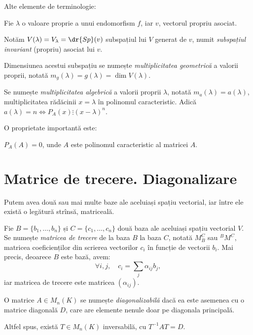Alte elemente de terminologie:
\begin{definition}\label{def:mult}
  Fie $ \lambda $ o valoare proprie a unui endomorfism $ f $, iar $ v $, vectorul
  propriu asociat.

  Notăm $ V(\lambda) = V_\lambda = \dr{Sp}(v) $ subspațiul lui $ V $ generat
  de $ v $, numit \emph{subspațiul invariant} (propriu) asociat lui $ v $.

  Dimensiunea acestui subspațiu se numește \emph{multiplicitatea geometrică}
  a valorii proprii, notată $ m_g(\lambda) = g(\lambda) = \dim V(\lambda) $.

  Se numește \emph{multiplicitatea algebrică} a valorii proprii $ \lambda $,
  notată $ m_a(\lambda) = a(\lambda) $, multiplicitatea rădăcinii $ x = \lambda $
  în polinomul caracteristic. Adică
  $ a(\lambda) = n \Leftrightarrow P_A(x) \vdots (x - \lambda)^n $.
\end{definition}

O proprietate importantă este:
\begin{theorem}\label{thm:ch}
  $ P_A(A) = 0 $, unde $ A $ este polinomul caracteristic al matricei $ A $.
\end{theorem}


\section{Matrice de trecere. Diagonalizare}

Putem avea două sau mai multe baze ale aceluiași spațiu vectorial,
iar între ele există o legătură strînsă, matriceală.

Fie $ B = \{ b_1, \dots, b_n \} $ și $ C = \{ c_1, \dots, c_n \} $ două
baza ale aceluiași spațiu vectorial $ V $. Se numește \emph{matricea de trecere}
de la baza $ B $ la baza $ C $, notată $ M_B^C $ sau $ {}^B M^C $, matricea
coeficienților din scrierea vectorilor $ c_i $ în funcție de vectorii $ b_i $.
Mai precis, deoarece $ B $ este bază, avem:
\[
  \forall i,j, \quad c_i = \sum_j \alpha_{ij} b_j,
\]
iar matricea de trecere este matricea $ (\alpha_{ij}) $.

\begin{definition}\label{def:diag}
  O matrice $ A \in M_n(K) $ se numește \emph{diagonalizabilă} dacă ea
  este asemenea cu o matrice diagonală $ D $, care are elemente nenule doar
  pe diagonala principală.

  Altfel spus, există $ T \in M_n(K) $ inversabilă, cu $ T^{-1} AT = D $.
\end{definition}

